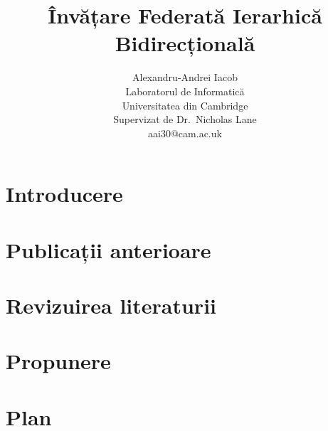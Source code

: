 \documentclass{article}
\title{\Large Învățare Federată Ierarhică Bidirecțională}
\author{
  Alexandru-Andrei Iacob \\
  \small Laboratorul de Informatică\\
  \small Universitatea din Cambridge\\
  \small Supervizat de Dr.\ Nicholas Lane\\
  \texttt\small{aai30@cam.ac.uk} \\
}
\begin{document}
\maketitle
% 
\section{Introducere}

\section{Publicații anterioare}

\section{Revizuirea literaturii}

\section{Propunere}


\section{Plan}



{\scriptsize
  }

\clearpage

\appendix
% 
\end{document}
